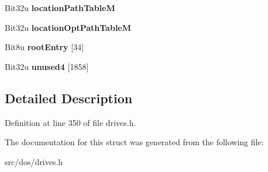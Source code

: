 \begin{DoxyCompactItemize}
\item 
\hypertarget{structisoPVD_ac7c7394e29ebb216df4029953ab6b337}{Bit32u {\bfseries location\-Path\-Table\-M}}\label{structisoPVD_ac7c7394e29ebb216df4029953ab6b337}

\item 
\hypertarget{structisoPVD_a69bb36d8476c0029f6a33b38d1fceb21}{Bit32u {\bfseries location\-Opt\-Path\-Table\-M}}\label{structisoPVD_a69bb36d8476c0029f6a33b38d1fceb21}

\item 
\hypertarget{structisoPVD_ac597b7476c7b1e6573c8ea621c423df8}{Bit8u {\bfseries root\-Entry} \mbox{[}34\mbox{]}}\label{structisoPVD_ac597b7476c7b1e6573c8ea621c423df8}

\item 
\hypertarget{structisoPVD_a78b65797080943af3276b8f142544450}{Bit32u {\bfseries unused4} \mbox{[}1858\mbox{]}}\label{structisoPVD_a78b65797080943af3276b8f142544450}

\end{DoxyCompactItemize}


\subsection{Detailed Description}


Definition at line 350 of file drives.\-h.



The documentation for this struct was generated from the following file\-:\begin{DoxyCompactItemize}
\item 
src/dos/drives.\-h\end{DoxyCompactItemize}
